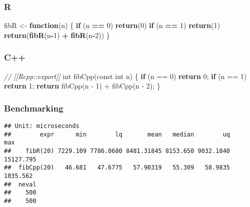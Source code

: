 \documentclass[]{article}
\newenvironment{Shaded}{\begin{snugshade}}{\end{snugshade}}
\newcommand{\KeywordTok}[1]{\textcolor[rgb]{0.13,0.29,0.53}{\textbf{#1}}}
\newcommand{\DataTypeTok}[1]{\textcolor[rgb]{0.13,0.29,0.53}{#1}}
\newcommand{\DecValTok}[1]{\textcolor[rgb]{0.00,0.00,0.81}{#1}}
\newcommand{\StringTok}[1]{\textcolor[rgb]{0.31,0.60,0.02}{#1}}
\newcommand{\CommentTok}[1]{\textcolor[rgb]{0.56,0.35,0.01}{\textit{#1}}}
\newcommand{\ControlFlowTok}[1]{\textcolor[rgb]{0.13,0.29,0.53}{\textbf{#1}}}
\newcommand{\OperatorTok}[1]{\textcolor[rgb]{0.81,0.36,0.00}{\textbf{#1}}}
\newcommand{\AttributeTok}[1]{\textcolor[rgb]{0.77,0.63,0.00}{#1}}
\newcommand{\NormalTok}[1]{#1}
\begin{document}
\subsubsection{R}\label{r}

\begin{Shaded}
\begin{Highlighting}[]
\NormalTok{fibR <-}\StringTok{ }\ControlFlowTok{function}\NormalTok{(n) \{}
  \ControlFlowTok{if}\NormalTok{ (n }\OperatorTok{==}\StringTok{ }\DecValTok{0}\NormalTok{) }\KeywordTok{return}\NormalTok{(}\DecValTok{0}\NormalTok{)}
  \ControlFlowTok{if}\NormalTok{ (n }\OperatorTok{==}\StringTok{ }\DecValTok{1}\NormalTok{) }\KeywordTok{return}\NormalTok{(}\DecValTok{1}\NormalTok{)}
  \KeywordTok{return}\NormalTok{(}\KeywordTok{fibR}\NormalTok{(n}\OperatorTok{-}\DecValTok{1}\NormalTok{) }\OperatorTok{+}\StringTok{ }\KeywordTok{fibR}\NormalTok{(n}\OperatorTok{-}\DecValTok{2}\NormalTok{))}
\NormalTok{\}}
\end{Highlighting}
\end{Shaded}

\subsubsection{C++}\label{c}

\begin{Shaded}
\begin{Highlighting}[]
\CommentTok{// [[Rcpp::export]]}
\DataTypeTok{int}\NormalTok{ fibCpp(}\AttributeTok{const} \DataTypeTok{int}\NormalTok{ n) \{}
  \ControlFlowTok{if}\NormalTok{ (n == }\DecValTok{0}\NormalTok{) }\ControlFlowTok{return} \DecValTok{0}\NormalTok{;}
  \ControlFlowTok{if}\NormalTok{ (n == }\DecValTok{1}\NormalTok{) }\ControlFlowTok{return} \DecValTok{1}\NormalTok{;}
  \ControlFlowTok{return}\NormalTok{ fibCpp(n - }\DecValTok{1}\NormalTok{) + fibCpp(n - }\DecValTok{2}\NormalTok{);}
\NormalTok{\}}
\end{Highlighting}
\end{Shaded}

\subsubsection{Benchmarking}\label{benchmarking}

\begin{verbatim}
## Unit: microseconds
##        expr      min        lq       mean   median        uq       max
##    fibR(20) 7229.109 7786.0680 8481.31845 8153.650 9032.1840 15127.795
##  fibCpp(20)   46.681   47.6775   57.90319   55.309   58.9835  1035.562
##  neval
##    500
##    500
\end{verbatim}
\end{document}
